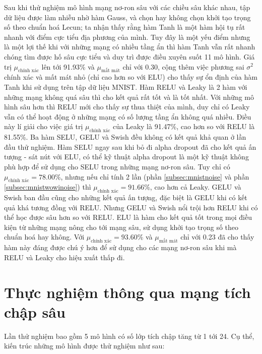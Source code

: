 Sau khi thử nghiệm mô hình mạng nơ-ron sâu với các chiều sâu khác nhau, tập dữ liệu được làm nhiễu nhờ hàm Gauss, và chọn hay không chọn khởi tạo trọng số theo chuẩn hoá Lecun;
ta nhận thấy rằng hàm Tanh là một hàm hội tụ rất nhanh với điểm cực tiểu địa phương của mình.
Tuy đây là một yếu điểm nhưng là một lợi thế khi với những mạng có nhiều tầng ẩn thì hàm Tanh vẫn rất nhanh chóng tìm được hố sâu cực tiểu và duy trì được điều xuyên suốt 11 mô hình.
Giá trị $\mu_{\text{chính xác}}$ lên tới 91.93\% và $\mu_{\text{mất mát}}$ chỉ với 0.30, cộng thêm việc phương sai $\sigma^2$ chính xác và mất mát nhỏ (chỉ cao hơn so với ELU) cho thấy sự ổn định của hàm Tanh khi sử dụng trên tập dữ liệu MNIST.
Hàm RELU và Leaky là 2 hàm với những mạng không quá sâu thì cho kết quả rất tốt và là tốt nhất.
Với những mô hình sâu hơn thì RELU mới cho thấy sự thua thiệt của mình, duy chỉ có Leaky vẫn có thể hoạt động ở những mạng có số lượng tầng ẩn không quá nhiều.
Điều này lí giải cho việc giá trị $\mu_{\text{chính xác}}$ của Leaky là 91.47\%, cao hơn so với RELU là 81.55\%.
Ba hàm SELU, GELU và Swish đều không có kết quả khả quan ở lần đầu thử nghiệm.
Hàm SELU ngay sau khi bỏ đi alpha dropout đã cho kết quả ấn tượng - sát nút với ELU, có thể kỹ thuật alpha dropout là một kỹ thuật không phù hợp để sử dụng cho SELU trong những mạng nơ-ron sâu.
Tuy chỉ có $\mu_{\text{chính xác}} = 78.00\%$, nhưng nếu chỉ tính 2 lần (phần \ref{subsec:mnistnoise} và phần \ref{subsec:mnistwowinoise}) thì $\mu_{\text{chính xác}} = 91.66\%$, cao hơn cả Leaky.
GELU và Swish ban đầu cũng cho những kết quả ấn tượng, đặc biệt là GELU khi có kết quả khá tương đồng với RELU.
Nhưng GELU và Swish nổi trội hơn RELU khi có thể học được sâu hơn so với RELU.
ELU là hàm cho kết quả tốt trong mọi điều kiện từ những mạng nông cho tới mạng sâu, sử dụng khởi tạo trọng số theo chuẩn hoá hay không. Với $\mu_{\text{chính xác}} = 93.60\%$ và $\mu_{\text{mất mát}}$ chỉ với 0.23 đã cho thấy hàm này đáng được chú ý hơn để sử dụng cho các mạng nơ-ron sâu khi mà RELU và Leaky cho hiệu xuất thấp đi.

\section{Thực nghiệm thông qua mạng tích chập sâu}\label{sec:mnistcnn}

Lần thử nghiệm bao gồm 5 mô hình có số lớp tích chập tăng từ 1 tới 24.
Cụ thể, kiến trúc những mô hình được thử nghiệm như sau:

